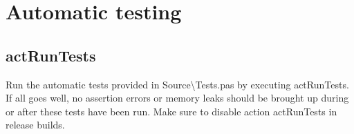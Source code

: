 \clearpage
\section{Automatic testing}
\subsection{actRunTests}
Run the automatic tests provided in Source\textbackslash Tests.pas by executing actRunTests. If all goes well, no assertion errors or memory leaks should be brought up during or after these tests have been run. Make sure to disable action actRunTests in release builds.